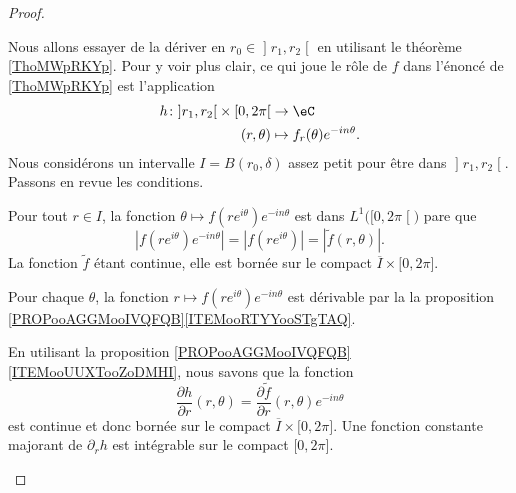 \begin{proof}
\begin{subproof}
    \item[Permuter dérivée et intégrale]
    Nous allons essayer de la dériver en \( r_0\in \mathopen] r_1 , r_2 \mathclose[\) en utilisant le théorème \ref{ThoMWpRKYp}. Pour y voir plus clair, ce qui joue le rôle de \( f\) dans l'énoncé de \ref{ThoMWpRKYp} est l'application
        \begin{equation}
            \begin{aligned}
            h\colon \mathopen] r_1 , r_2 \mathclose[\times \mathopen[ 0 , 2\pi \mathclose[&\to \eC \\
                (r,\theta)&\mapsto  f_r(\theta) e^{-in\theta}.
            \end{aligned}
        \end{equation}
    Nous considérons un intervalle \( I=B(r_0,\delta)\) assez petit pour être dans \( \mathopen] r_1 , r_2 \mathclose[\). Passons en revue les conditions.
        \begin{subproof}
        \item[Pour \ref{ITEMooAFVMooAeCEco}]
        Pour tout \( r\in I\), la fonction \( \theta\mapsto f(r e^{i\theta}) e^{-in\theta}\) est dans \( L^1\big( \mathopen[ 0 , 2\pi \mathclose[ \big)\) pare que
            \begin{equation}
                | f(r e^{i\theta}) e^{-in\theta} |=| f(r e^{i\theta}) |=| \tilde f(r,\theta) |.
            \end{equation}
            La fonction \( \tilde f\) étant continue, elle est bornée sur le compact \( \overline{ I }\times \mathopen[ 0 , 2\pi \mathclose]\).
        \item[Pour \ref{ITEMooXIZXooGPYFyT}]
            Pour chaque \( \theta\), la fonction \( r\mapsto f(r e^{i\theta}) e^{-in\theta}\) est dérivable par la la proposition \ref{PROPooAGGMooIVQFQB}\ref{ITEMooRTYYooSTgTAQ}.
        \item[Pour \ref{ITEMooDTTIooWkldfB}]
            En utilisant la proposition \ref{PROPooAGGMooIVQFQB}\ref{ITEMooUUXTooZoDMHI}, nous savons que la fonction
            \begin{equation}
                \frac{ \partial h }{ \partial r  }(r,\theta)=\frac{ \partial \tilde f }{ \partial r }(r,\theta) e^{-in\theta}
            \end{equation}
            est continue et donc bornée sur le compact \( \overline{ I }\times \mathopen[ 0 , 2\pi \mathclose]\). Une fonction constante majorant de \( \partial_rh\) est intégrable sur le compact \( \mathopen[ 0 , 2\pi \mathclose]\).
        \end{subproof}

\end{subproof}
\end{proof}
